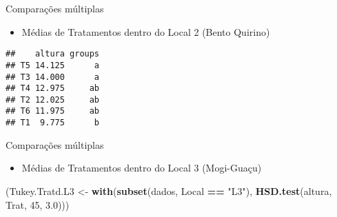 \documentclass[
  ignorenonframetext,
]{beamer}
\newenvironment{Shaded}{\begin{snugshade}}{\end{snugshade}}
\newcommand{\DecValTok}[1]{\textcolor[rgb]{0.00,0.00,0.81}{#1}}
\newcommand{\FloatTok}[1]{\textcolor[rgb]{0.00,0.00,0.81}{#1}}
\newcommand{\FunctionTok}[1]{\textcolor[rgb]{0.13,0.29,0.53}{\textbf{#1}}}
\newcommand{\NormalTok}[1]{#1}
\newcommand{\OtherTok}[1]{\textcolor[rgb]{0.56,0.35,0.01}{#1}}
\newcommand{\SpecialCharTok}[1]{\textcolor[rgb]{0.81,0.36,0.00}{\textbf{#1}}}
\newcommand{\StringTok}[1]{\textcolor[rgb]{0.31,0.60,0.02}{#1}}
\providecommand{\tightlist}{%
  \setlength{\itemsep}{0pt}\setlength{\parskip}{0pt}}
\begin{document}
\begin{frame}[fragile]{Comparações múltiplas}
\protect\hypertarget{comparauxe7uxf5es-muxfaltiplas-5}{}
\begin{itemize}
\tightlist
\item
  Médias de Tratamentos dentro do Local 2 (Bento Quirino)
\end{itemize}

\begin{verbatim}
##    altura groups
## T5 14.125      a
## T3 14.000      a
## T4 12.975     ab
## T2 12.025     ab
## T6 11.975     ab
## T1  9.775      b
\end{verbatim}
\end{frame}

\begin{frame}[fragile]{Comparações múltiplas}
\protect\hypertarget{comparauxe7uxf5es-muxfaltiplas-6}{}
\begin{itemize}
\tightlist
\item
  Médias de Tratamentos dentro do Local 3 (Mogi-Guaçu)
\end{itemize}

\begin{Shaded}
\begin{Highlighting}[]
\NormalTok{(Tukey.Tratd.L3 }\OtherTok{\textless{}{-}} \FunctionTok{with}\NormalTok{(}\FunctionTok{subset}\NormalTok{(dados, Local }\SpecialCharTok{==} \StringTok{"L3"}\NormalTok{),}
                        \FunctionTok{HSD.test}\NormalTok{(altura, }
\NormalTok{                                 Trat,}
                                 \DecValTok{45}\NormalTok{,}
                                 \FloatTok{3.0}\NormalTok{)))}
\end{Highlighting}
\end{Shaded}
\end{frame}
\end{document}
